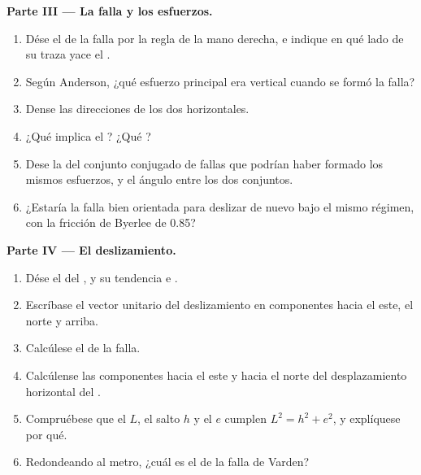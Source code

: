 \begin{problem}
\medskip
\noindent\textbf{Parte III --- La falla y los esfuerzos.}
\begin{enumerate}[resume]
  \item Dése el  de la falla por la regla de la mano derecha, e indique en qué lado de su traza yace el .
  \item Según Anderson, ¿qué esfuerzo principal era vertical cuando se formó la falla?
  \item Dense las direcciones de los dos  horizontales.
  \item ¿Qué  implica el ? ¿Qué ?
  \item Dese la  del conjunto conjugado de fallas que podrían haber formado los mismos esfuerzos, y el ángulo entre los dos conjuntos.
  \item ¿Estaría la falla bien orientada para deslizar de nuevo bajo el mismo régimen, con la fricción de Byerlee de 0.85?
\end{enumerate}

\medskip
\noindent\textbf{Parte IV --- El deslizamiento.}
\begin{enumerate}[resume]
  \item Dése el  del , y su tendencia e .
  \item Escríbase el vector unitario del deslizamiento en componentes hacia el este, el norte y arriba.
  \item Calcúlese el  de la falla.
  \item Calcúlense las componentes hacia el este y hacia el norte del desplazamiento horizontal del .
  \item Compruébese que el  $L$, el salto $h$ y el  $e$ cumplen $L^2 = h^2 + e^2$, y explíquese por qué.
  \item Redondeando al metro, ¿cuál es el  de la falla de Varden?
\end{enumerate}
\end{problem}
